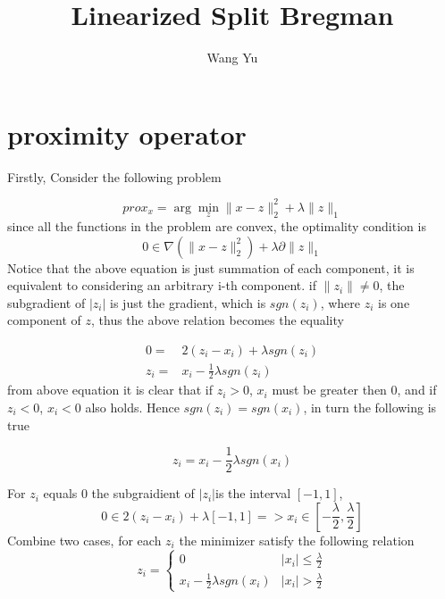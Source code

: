 \documentclass[11pt]{amsart}
\title{Linearized Split Bregman}
\author{Wang Yu}
\begin{document}
\maketitle
\section{proximity operator}\label{sec:prox}
Firstly, Consider the following problem

\begin{equation}
prox_{x}=\arg\min_{z}\|x-z\|^2_2 + \lambda \|z\|_1
\end{equation}
since all the functions in the problem are convex, the optimality condition is
\[
0\in\nabla(\|x-z\|^2_2)+\lambda \partial\|z\|_1
\]
Notice that the above equation is just summation of each component, it is equivalent to considering an arbitrary i-th component.  if $\|z_i\| \neq 0$, the subgradient of $|z_i|$ is just  the gradient, which is $sgn(z_i) $, where $z_i$ is one component of $z$, thus the above relation becomes the equality

\begin{align}
0=&2(z_i - x_i) + \lambda sgn(z_i) \\
z_i = &x_i - \frac{1}{2}\lambda sgn(z_i)
\end{align}
from above equation it is clear that if $z_i > 0$, $x_i$ must be greater then 0, and if $z_i <0$, $x_i < 0$ also holds. Hence $sgn(z_i) = sgn(x_i)$, in turn the following is true
 
 \begin{equation}
z_i=x_i - \frac{1}{2}\lambda sgn(x_i)
\end{equation} 

For $z_i$ equals 0 the subgraidient of  $|z_i|$is the interval $[-1, 1]$, 
\[
0\in2 ( z_i- x_i)+ \lambda [-1, 1] => x_i \in [-\frac{\lambda}{2}, \frac{\lambda}{2}]
\]
Combine two cases, for each $z_i$ the minimizer satisfy the following relation
\begin{equation}
z_i=\left\{
\begin{array}{lr}
0   & |x_i| \leq \frac{\lambda}{2} \\
x_i - \frac{1}{2}\lambda sgn(x_i) & |x_i| > \frac{\lambda}{2}
\end{array}
\right.
\end{equation}
\end{document}
